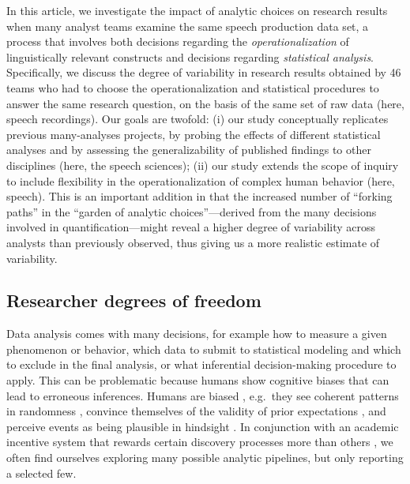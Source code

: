 \documentclass[Review,times,sageh]{sagej}
\begin{document}
In this article, we investigate the impact of analytic choices on research results when many analyst teams examine the same speech production data set, a process that involves both decisions regarding the \emph{operationalization} of linguistically relevant constructs and decisions regarding \emph{statistical analysis}.
Specifically, we discuss the degree of variability in research results obtained by 46 teams who had to choose the operationalization and statistical procedures to answer the same research question, on the basis of the same set of raw data (here, speech recordings).
Our goals are twofold: (i) our study conceptually replicates previous many-analyses projects, by probing the effects of different statistical analyses and by assessing the generalizability of published findings to other disciplines (here, the speech sciences);
(ii) our study extends the scope of inquiry to include flexibility in the operationalization of complex human behavior (here, speech).
This is an important addition in that the increased number of ``forking paths'' in the ``garden of analytic choices''---derived from the many decisions involved in quantification---might reveal a higher degree of variability across analysts than previously observed, thus giving us a more realistic estimate of variability.

\hypertarget{researcher-degrees-of-freedom}{%
\subsection{Researcher degrees of freedom}\label{researcher-degrees-of-freedom}}

Data analysis comes with many decisions, for example how to measure a given phenomenon or behavior, which data to submit to statistical modeling and which to exclude in the final analysis, or what inferential decision-making procedure to apply.
This can be problematic because humans show cognitive biases that can lead to erroneous inferences.
Humans are biased \citep[e.g.,][]{tversky1974judgment}, e.g.~they see coherent patterns in randomness \citep{brugger2001}, convince themselves of the validity of prior expectations \citep[``I knew it'',][]{nickerson1998confirmation}, and perceive events as being plausible in hindsight \citep[``I knew it all along'',][]{fischhoff1975hindsight}.
In conjunction with an academic incentive system that rewards certain discovery processes more than others \citep{sterling1959publication, koole2012rewarding}, we often find ourselves exploring many possible analytic pipelines, but only reporting a selected few.
\end{document}
